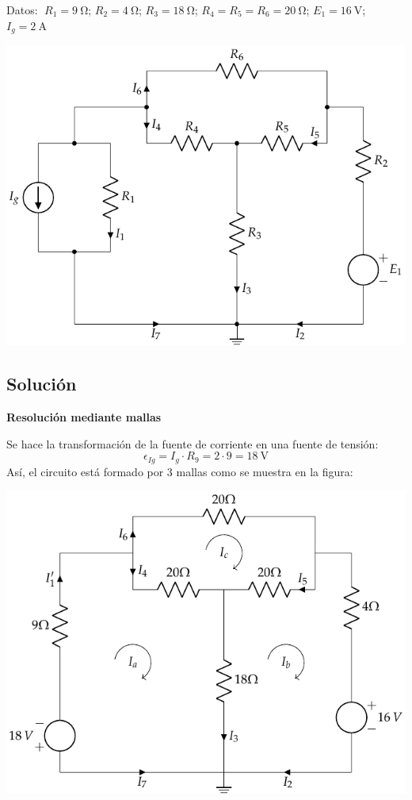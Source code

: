      \vspace{2mm}
     Datos: $\; R_1 = \qty{9}{\ohm}$;\; $R_2 = \qty{4}{\ohm}$;\; $R_3 = \qty{18}{\ohm}$;\; $R_4 = R_5 = R_6 = \qty{20}{\ohm}$;\; $E_1 = \qty{16}{\volt}$;\; $I_g = \qty{2}{\ampere}$

     \begin{center}
       \includegraphics{figuras/BT1_12.pdf}
     \end{center}


     \subsection*{Solución}

     \textbf{Resolución mediante mallas}

     Se hace la transformación de la fuente de corriente en una fuente
     de tensión:
     \begin{equation*}
       \epsilon_{Ig}=I_g\cdot R_9=2\cdot 9=\qty{18}{\volt}
     \end{equation*}
     Así, el circuito está formado por 3 mallas como se muestra en la
     figura:
     \begin{center}
       \includegraphics{figuras/BT1_12_mallas.pdf}
     \end{center}
     
